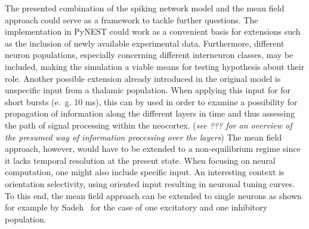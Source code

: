 The presented combination of the spiking network model and the mean field approach
could serve as a framework to tackle further questions. 
The implementation in PyNEST could work as a convenient basis for extensions 
such as the inclusion of newly available experimental data.
Furthermore, different neuron populations, 
especially concerning different interneuron classes, may be included, 
making the simulation a viable means for testing hypothesis about their 
role. 
Another possible extension already introduced in the 
original model \cite{potjans2014} is unspecific input from a thalamic population. 
When applying this input for for short bursts (e.~g. 10 ms), 
this can by used in order to examine a possibility for propagation of information
along the different layers in time and thus assessing the 
path of signal processing within the neocortex.
(\emph{see ??? for an overview of 
the presumed way of information processing over the layers})
The mean field approach, however, would have to be extended to a non-equilibrium 
regime since it lacks temporal resolution at the present state. 
When focusing on neural computation, one might also include specific input.
An interesting context is orientation selectivity, using 
oriented input resulting in neuronal tuning curves.
To this end, the mean field approach can be extended to single neurons 
as shown for example by Sadeh~\cite{sadeh2015orientation} 
for the case of one excitatory and one inhibitory population.




